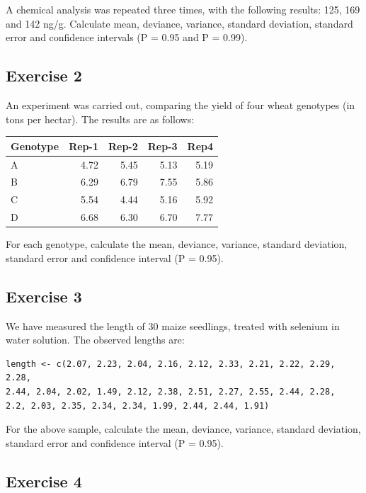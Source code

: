 \documentclass[a4paper,12pt,oneside]{book}
\begin{document}
A chemical analysis was repeated three times, with the following results: 125, 169 and 142 ng/g. Calculate mean, deviance, variance, standard deviation, standard error and confidence intervals (P = 0.95 and P = 0.99).

\hypertarget{exercise-2-3}{%
\subsection{Exercise 2}\label{exercise-2-3}}

An experiment was carried out, comparing the yield of four wheat genotypes (in tons per hectar). The results are as follows:

\begin{tabular}{l|r|r|r|r}
\hline
Genotype & Rep-1 & Rep-2 & Rep-3 & Rep4\\
\hline
A & 4.72 & 5.45 & 5.13 & 5.19\\
\hline
B & 6.29 & 6.79 & 7.55 & 5.86\\
\hline
C & 5.54 & 4.44 & 5.16 & 5.92\\
\hline
D & 6.68 & 6.30 & 6.70 & 7.77\\
\hline
\end{tabular}

For each genotype, calculate the mean, deviance, variance, standard deviation, standard error and confidence interval (P = 0.95).

\hypertarget{exercise-3-3}{%
\subsection{Exercise 3}\label{exercise-3-3}}

We have measured the length of 30 maize seedlings, treated with selenium in water solution. The observed lengths are:

\begin{verbatim}
length <- c(2.07, 2.23, 2.04, 2.16, 2.12, 2.33, 2.21, 2.22, 2.29, 2.28, 
2.44, 2.04, 2.02, 1.49, 2.12, 2.38, 2.51, 2.27, 2.55, 2.44, 2.28, 
2.2, 2.03, 2.35, 2.34, 2.34, 1.99, 2.44, 2.44, 1.91)
\end{verbatim}

For the above sample, calculate the mean, deviance, variance, standard deviation, standard error and confidence interval (P = 0.95).

\hypertarget{exercise-4-1}{%
\subsection{Exercise 4}\label{exercise-4-1}}
\end{document}
